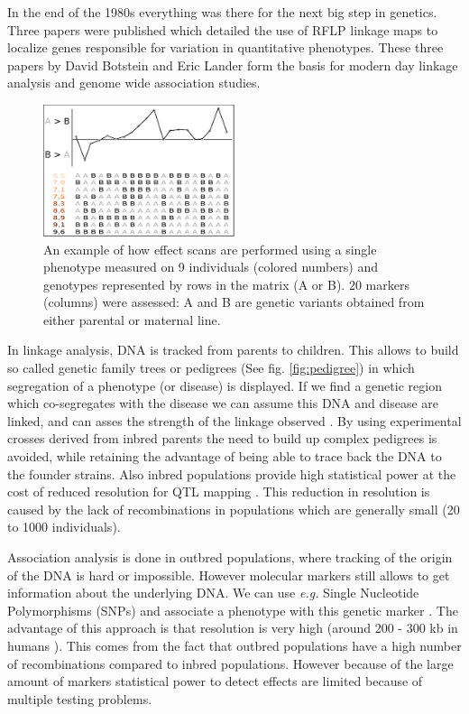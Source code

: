 In the end of the 1980s everything was there for the next big step in genetics. Three 
papers were published which detailed the use of RFLP linkage maps to localize genes 
responsible for variation in quantitative phenotypes. These three papers by David Botstein 
and Eric Lander \cite{Lander:1986, Lander:1987, Lander:1989} form the basis for modern 
day linkage analysis and genome wide association studies. 

\begin{figure}
  \centering
  \includegraphics[width=0.5\textwidth]{eps/image_1_1}
  \caption[Effect scan across the genome.]
    {An example of how effect scans are performed using a single phenotype measured on 9 individuals (colored numbers)
    and genotypes represented by rows in the matrix (A or B). 20 markers (columns) were assessed: A and B are genetic 
    variants obtained from either parental or maternal line. }
    \label{fig:effectscan}
\end{figure}

In linkage analysis, DNA is tracked from parents to children. This allows to build so called 
genetic family trees or pedigrees (See fig. \ref{fig:pedigree}) in which segregation of a phenotype (or 
disease) is displayed. If we find a genetic region which co-segregates with the disease we can assume this DNA and 
disease are linked, and can asses the strength of the linkage observed \cite{Rosyara:2009}. By using experimental 
crosses derived from inbred parents the need to build up complex pedigrees is avoided, while 
retaining the advantage of being able to trace back the DNA to the founder strains. Also inbred 
populations provide high statistical power at the cost of reduced resolution for QTL mapping \cite{Jansen:2001a}. 
This reduction in resolution is caused by the lack of recombinations in populations which are 
generally small (20 to 1000 individuals).

Association analysis is done in outbred populations, where tracking of the origin of the 
DNA is hard or impossible. However molecular markers still allows to get information 
about the underlying DNA. We can use \emph{e.g.} Single Nucleotide Polymorphisms (SNPs) and associate 
a phenotype with this genetic marker \cite{Mehta:2013}. The advantage of this approach is that resolution is 
very high (around 200 - 300 kb in humans \cite{HapMap:2005}). This comes from the fact that outbred populations 
have a high number of recombinations compared to inbred populations. However because of the large amount of 
markers statistical power to detect effects are limited because of multiple testing problems.

